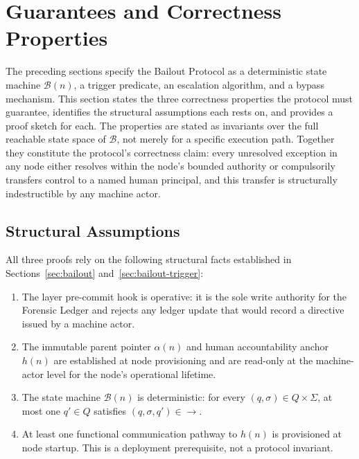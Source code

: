\section{Guarantees and Correctness Properties}
\label{sec:correctness}

The preceding sections specify the Bailout Protocol as a deterministic state machine
$\mathcal{B}(n)$, a trigger predicate, an escalation algorithm, and a bypass mechanism.
This section states the three correctness properties the protocol must guarantee,
identifies the structural assumptions each rests on, and provides a proof sketch for
each. The properties are stated as invariants over the full reachable state space of
$\mathcal{B}$, not merely for a specific execution path. Together they constitute the
protocol's correctness claim: every unresolved exception in any \bxthree{} node either
resolves within the node's bounded authority or compulsorily transfers control to a
named human principal, and this transfer is structurally indestructible by any machine
actor.

\subsection{Structural Assumptions}
\label{sec:assumptions}

All three proofs rely on the following structural facts established in
Sections~\ref{sec:bailout} and~\ref{sec:bailout-trigger}:

\begin{enumerate}
  \setlength\itemsep{0pt}
  \item[\textbf{(A1)}] \label{asm:fact-layer} The \fact{} layer pre-commit hook is
    operative: it is the sole write authority for the Forensic Ledger and rejects any
    ledger update that would record a directive issued by a machine actor.
  \item[\textbf{(A2)}] \label{asm:immutable-pointer} The immutable parent pointer
    $\alpha(n)$ and human accountability anchor $h(n)$ are established at node
    provisioning and are read-only at the machine-actor level for the node's operational
    lifetime.
  \item[\textbf{(A3)}] \label{asm:determinism} The state machine $\mathcal{B}(n)$ is
    deterministic: for every $(q, \sigma) \in Q \times \Sigma$, at most one
    $q' \in Q$ satisfies $(q, \sigma, q') \in \rightarrow$.
  \item[\textbf{(A4)}] \label{asm:pathways} At least one functional communication
    pathway to $h(n)$ is provisioned at node startup. This is a deployment prerequisite,
    not a protocol invariant.
\end{enumerate}

